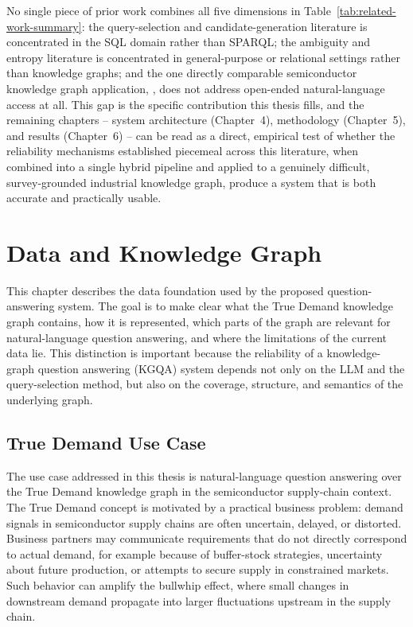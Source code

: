 \documentclass[
  12pt,
  english,
  oneside]{report}
\begin{document}
No single piece of prior work combines all five dimensions in
Table~\ref{tab:related-work-summary}: the query-selection and
candidate-generation literature is concentrated in the SQL domain rather
than SPARQL; the ambiguity and entropy literature is concentrated in
general-purpose or relational settings rather than knowledge graphs; and
the one directly comparable semiconductor knowledge graph application,
\citet{ramzy2021knowgraphpm}, does not address open-ended natural-language
access at all. This gap is the specific contribution this thesis fills,
and the remaining chapters -- system architecture (Chapter~4), methodology
(Chapter~5), and results (Chapter~6) -- can be read as a direct, empirical
test of whether the reliability mechanisms established piecemeal across
this literature, when combined into a single hybrid pipeline and applied
to a genuinely difficult, survey-grounded industrial knowledge graph,
produce a system that is both accurate and practically usable.

\chapter{Data and Knowledge Graph}
\label{chap:data-kg}

This chapter describes the data foundation used by the proposed question-answering system. The goal is to make clear what the True Demand knowledge graph contains, how it is represented, which parts of the graph are relevant for natural-language question answering, and where the limitations of the current data lie. This distinction is important because the reliability of a knowledge-graph question answering (KGQA) system depends not only on the LLM and the query-selection method, but also on the coverage, structure, and semantics of the underlying graph.

\section{True Demand Use Case}
\label{sec:true-demand-use-case}

The use case addressed in this thesis is natural-language question answering over the True Demand knowledge graph in the semiconductor supply-chain context. The True Demand concept is motivated by a practical business problem: demand signals in semiconductor supply chains are often uncertain, delayed, or distorted. Business partners may communicate requirements that do not directly correspond to actual demand, for example because of buffer-stock strategies, uncertainty about future production, or attempts to secure supply in constrained markets. Such behavior can amplify the bullwhip effect, where small changes in downstream demand propagate into larger fluctuations upstream in the supply chain.
\end{document}
